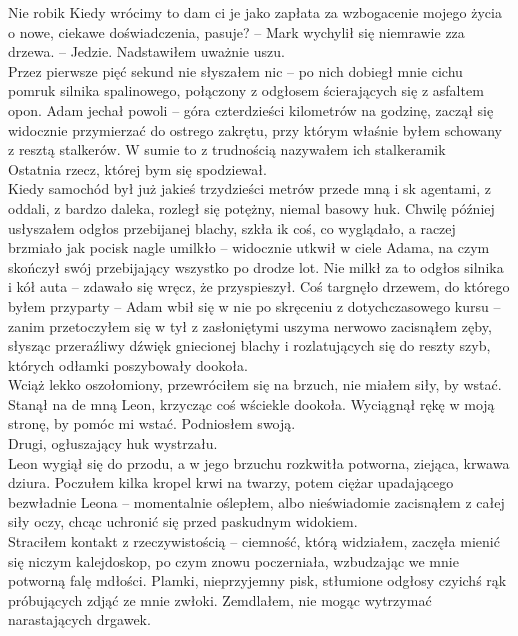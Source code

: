 \documentclass[../MAIN.tex]{subfiles}
\begin{document}
\xx Nie robi\3k Kiedy wrócimy to dam ci je jako zapłata za wzbogacenie mojego życia o nowe, ciekawe doświadczenia, pasuje? -- Mark wychylił się niemrawie zza drzewa. -- Jedzie.
\qd
Nadstawiłem uważnie uszu.\\
Przez pierwsze pięć sekund nie słyszałem nic -- po nich dobiegł mnie cichu pomruk silnika spalinowego, połączony z odgłosem ścierających się z asfaltem opon. Adam jechał powoli -- góra czterdzieści kilometrów na godzinę, zaczął się widocznie przymierzać do ostrego zakrętu, przy którym właśnie byłem schowany z resztą stalkerów. W sumie to z trudnością nazywałem ich stalkerami\3k\\
Ostatnia rzecz, której bym się spodziewał.\\
Kiedy samochód był już jakieś trzydzieści metrów przede mną i s\3k agentami, z oddali, z bardzo daleka, rozległ się potężny, niemal basowy huk. Chwilę później usłyszałem odgłos przebijanej blachy, szkła i\3k coś, co wyglądało, a raczej brzmiało jak pocisk nagle umilkło -- widocznie utkwił w ciele Adama, na czym skończył swój przebijający wszystko po drodze lot. Nie milkł za to odgłos silnika i kół auta -- zdawało się wręcz, że przyspieszył. Coś targnęło drzewem, do którego byłem przyparty -- Adam wbił się w nie po skręceniu z dotychczasowego kursu -- zanim przetoczyłem się w tył z zasłoniętymi uszyma nerwowo zacisnąłem zęby, słysząc przeraźliwy dźwięk gniecionej blachy i rozlatujących się do reszty szyb, których odłamki poszybowały dookoła.\\
Wciąż lekko oszołomiony, przewróciłem się na brzuch, nie miałem siły, by wstać.\\
Stanął na de mną Leon, krzycząc coś wściekle dookoła. Wyciągnął rękę w moją stronę, by pomóc mi wstać. Podniosłem swoją.\\
Drugi, ogłuszający huk wystrzału.\\
Leon wygiął się do przodu, a w jego brzuchu rozkwitła potworna, ziejąca, krwawa dziura. Poczułem kilka kropel krwi na twarzy, potem ciężar upadającego bezwładnie Leona -- momentalnie oślepłem, albo nieświadomie zacisnąłem z całej siły oczy, chcąc uchronić się przed paskudnym widokiem.\\ Straciłem kontakt z rzeczywistością -- ciemność, którą widziałem, zaczęła mienić się niczym kalejdoskop, po czym znowu poczerniała, wzbudzając we mnie potworną falę mdłości. Plamki, nieprzyjemny pisk, stłumione odgłosy czyichś rąk próbujących zdjąć ze mnie zwłoki. Zemdlałem, nie mogąc wytrzymać narastających drgawek.
\end{document}
